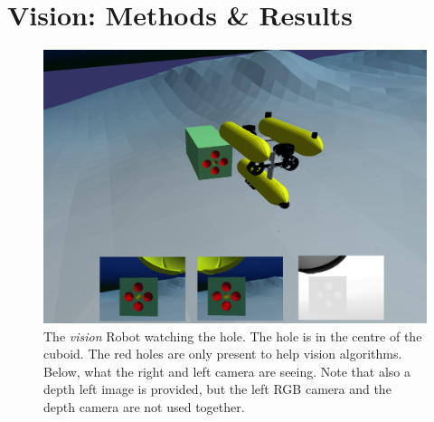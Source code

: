 

\chapter{Vision: Methods \& Results}
\label{chap:vision}
\ifpdf
    \graphicspath{{Vision/Figures/PNG/}{Vision/Figures/PDF/}{Vision/Figures/}}
\else
    \graphicspath{{Vision/Figures/EPS/}{Vision/Figures/}}
\fi

\begin{figure}[H]
	\centering
	\includegraphics[width=12.0cm]{Vision_uwsim.jpeg}
	\caption[The Vision Robot watching the hole]{The \textit{vision} Robot watching the hole. The hole is in the centre of the cuboid. The red holes are only present to help vision algorithms. Below, what the right and left camera are seeing. Note that also a depth left image is provided, but the left RGB camera and the depth camera are not used together.}
	\label{fig:vision-uwsim}
\end{figure}


